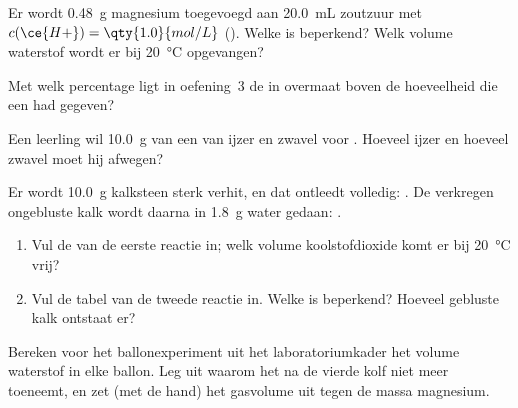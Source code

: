\begin{exercise}[$\star\star$]\label{exo:g10:reaction-progress-table:10}
Er wordt \qty{0.48}{g} magnesium toegevoegd aan \qty{20.0}{mL} zoutzuur
met $c(\ce{H+}) = \qty{1.0}{mol/L}$
(). Welke  is beperkend? Welk volume
waterstof wordt er bij \qty{20}{\celsius} opgevangen?
\end{exercise}

\begin{exercise}[$\star\star$]\label{exo:g10:reaction-progress-table:11}
Met welk percentage ligt in oefening~3 de  in overmaat boven de
hoeveelheid die een  had gegeven?
\end{exercise}

\begin{exercise}[$\star\star\star$]\label{exo:g10:reaction-progress-table:12}
Een leerling wil \qty{10.0}{g} van een  van ijzer
en zwavel voor . Hoeveel ijzer en hoeveel zwavel moet
hij afwegen?
\end{exercise}

\begin{exercise}[$\star\star\star$]\label{exo:g10:reaction-progress-table:13}
Er wordt \qty{10.0}{g} kalksteen  sterk verhit, en dat ontleedt
volledig: . De verkregen ongebluste kalk 
wordt daarna in \qty{1.8}{g} water gedaan: .
\begin{enumerate}
  \item Vul de  van de eerste reactie in; welk volume
        koolstofdioxide komt er bij \qty{20}{\celsius} vrij?
  \item Vul de tabel van de tweede reactie in. Welke  is
        beperkend? Hoeveel gebluste kalk  ontstaat er?
\end{enumerate}
\end{exercise}

\begin{exercise}[$\star\star\star$]\label{exo:g10:reaction-progress-table:14}
Bereken voor het ballonexperiment uit het laboratoriumkader het volume
waterstof in elke ballon. Leg uit waarom het na de vierde kolf niet meer
toeneemt, en zet (met de hand) het gasvolume uit tegen de massa
magnesium.
\end{exercise}

